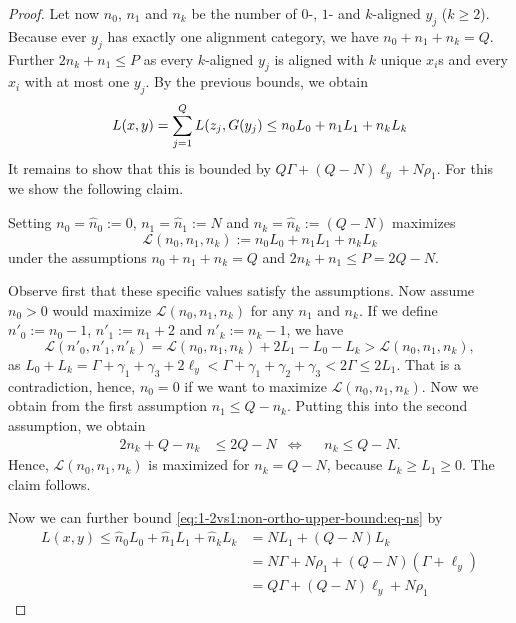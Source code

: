 \begin{proof}
Let now $n_0$, $n_1$ and $n_k$ be the number of $0$-, $1$- and $k$-aligned $y_j$ ($k \geq 2$).
Because ever $y_j$ has exactly one alignment category, we have $n_0 + n_1 + n_k = Q$.
Further $2n_k + n_1 \leq P$ as every $k$-aligned $y_j$ is aligned with $k$ unique $x_i$s and every $x_i$ with at most one $y_j$.
By the previous bounds, we obtain
\begin{equation}
\label{eq:1-2vs1:non-ortho-upper-bound:eq-ns}
	L(x,y) = \sum_{j=1}^Q L(z_j, G(y_j) \leq n_0 L_0 + n_1 L_1 + n_k L_k 
\end{equation}
It remains to show that this is bounded by $Q\Gamma + (Q-N)\ell_y + N\rho_1$. 
For this we show the following claim.
\begin{claim}
Setting $n_0 = \hat{n}_0 := 0$, $n_1 = \hat{n}_1 := N$ and $n_k = \hat{n}_k := (Q-N)$ maximizes
\[
\mathcal{L}(n_0, n_1, n_k) := n_0 L_0 + n_1 L_1 + n_k L_k
\]
under the assumptions $n_0 + n_1 + n_k = Q$ and $2n_k + n_1 \leq P = 2Q - N$.
\end{claim}
Observe first that these specific values satisfy the assumptions.
Now assume $n_0 > 0$ would maximize $\mathcal{L}(n_0, n_1, n_k)$ for any $n_1$ and $n_k$.
If we define $n'_0 := n_0 - 1$, $n'_1 := n_1 + 2$ and $n'_k := n_k - 1$, we have
\[
	\mathcal{L}(n'_0, n'_1, n'_k) = \mathcal{L}(n_0, n_1, n_k) + 2L_1 - L_0 - L_k > \mathcal{L}(n_0, n_1, n_k),
\]
as $L_0 + L_k = \Gamma + \gamma_1 + \gamma_3 + 2\ell_y < \Gamma + \gamma_1 + \gamma_2 + \gamma_3 < 2\Gamma \leq 2L_1$.
That is a contradiction, hence, $n_0 = 0$ if we want to maximize $\mathcal{L}(n_0, n_1, n_k)$.
Now we obtain from the first assumption $n_1 \leq Q - n_k$.
Putting this into the second assumption, we obtain
\begin{align*}
2n_k + Q - n_k &\leq 2Q - N %
&\Leftrightarrow& %
&n_k \leq Q - N.
\end{align*}
Hence, $\mathcal{L}(n_0, n_1, n_k)$ is maximized for $n_k = Q-N$, because $L_k \geq L_1 \geq 0$. 
The claim follows.



Now we can further bound \autoref{eq:1-2vs1:non-ortho-upper-bound:eq-ns} by
\begin{align*}
L(x,y) \leq \hat{n}_0 L_0 + \hat{n}_1 L_1 + \hat{n}_k L_k &= NL_1 + (Q-N) L_k  \\
	&= N\Gamma + N\rho_1 + (Q-N)(\Gamma + \ell_y) \\
	&= Q\Gamma + (Q-N)\ell_y + N\rho_1
\end{align*}
\end{proof}




